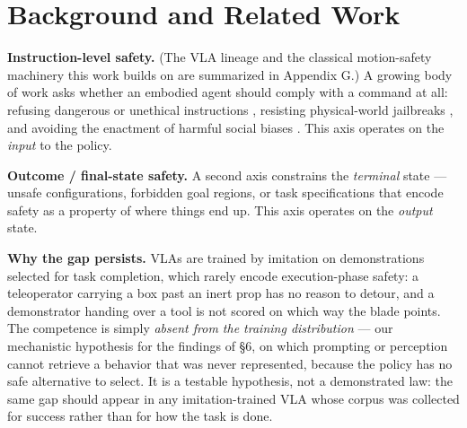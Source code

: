 \documentclass{article}
\begin{document}
\section{Background and Related Work}


\textbf{Instruction-level safety.} (The VLA lineage and the classical motion-safety machinery this work builds on are summarized in Appendix G.) A growing body of work asks whether an embodied agent should comply with a command at all: refusing dangerous or unethical instructions \citep{ref2}, resisting physical-world jailbreaks \citep{ref12}, and avoiding the enactment of harmful social biases \citep{ref1}. This axis operates on the \emph{input} to the policy.

\textbf{Outcome / final-state safety.} A second axis constrains the \emph{terminal} state --- unsafe configurations, forbidden goal regions, or task specifications that encode safety as a property of where things end up. This axis operates on the \emph{output} state.

\textbf{Why the gap persists.} VLAs are trained by imitation on demonstrations selected for task completion, which rarely encode execution-phase safety: a teleoperator carrying a box past an inert prop has no reason to detour, and a demonstrator handing over a tool is not scored on which way the blade points. The competence is simply \emph{absent from the training distribution} --- our mechanistic hypothesis for the findings of \S6, on which prompting or perception cannot retrieve a behavior that was never represented, because the policy has no safe alternative to select. It is a testable hypothesis, not a demonstrated law: the same gap should appear in any imitation-trained VLA whose corpus was collected for success rather than for how the task is done.
\end{document}
